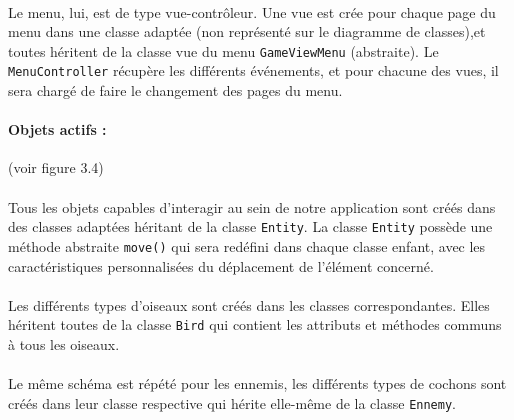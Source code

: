 \documentclass[a4paper,12pt]{report}
\begin{document}
\paragraph{}Le menu, lui, est de type vue-contrôleur. Une vue est crée pour chaque page du menu dans une classe adaptée (non représenté sur le diagramme de classes),et toutes héritent de la classe vue du menu \verb+GameViewMenu+ (abstraite). Le \verb+MenuController+ récupère les différents événements, et pour chacune des vues, il sera chargé de faire le changement des pages du menu.

\paragraph{Objets actifs :}(voir figure 3.4)

\paragraph{}Tous les objets capables d'interagir au sein de notre application sont créés dans des classes adaptées héritant de la classe \verb+Entity+. La classe \verb+Entity+ possède une méthode abstraite \verb+move()+ qui sera redéfini dans chaque classe enfant, avec les caractéristiques personnalisées du déplacement de l'élément concerné.

\paragraph{}Les différents types d'oiseaux sont créés dans les classes correspondantes. Elles héritent toutes de la classe \verb+Bird+ qui contient les attributs et méthodes communs à tous les oiseaux.

\paragraph{}Le même schéma est répété pour les ennemis, les différents types de cochons sont créés dans leur classe respective qui hérite elle-même de la classe \verb+Ennemy+.
\end{document}
